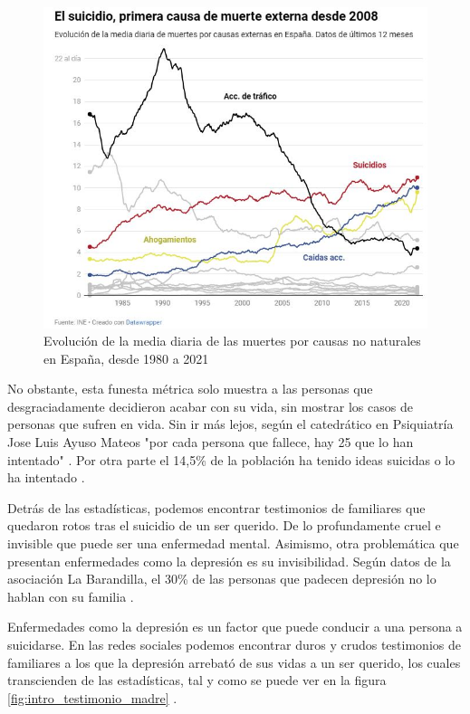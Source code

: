 \begin{figure}[h]
    \centering
    \includegraphics[width=0.85\linewidth]{figures/causas no naturales.jpg}
    \caption{Evolución de la media diaria de las muertes por causas no naturales en España, desde 1980 a 2021 \cite{sanchez_once_2023}}
    \label{fig:intro:causas_no_naturales}
\end{figure}

No obstante, esta funesta métrica solo muestra a las personas que desgraciadamente decidieron acabar con su vida, sin mostrar los casos de personas que sufren en vida. Sin ir más lejos, según el catedrático en Psiquiatría Jose Luis Ayuso Mateos "por cada persona que fallece, hay 25 que lo han intentado"  \cite{sanchez_once_2023}.  Por otra parte el 14,5\% de la población ha tenido ideas suicidas o lo ha intentado \cite{comunicacion_cuatro_2023}.

Detrás de las estadísticas, podemos encontrar testimonios de familiares que quedaron rotos tras el suicidio de un ser querido. De lo profundamente cruel e invisible que puede ser una enfermedad mental. Asimismo, otra problemática que presentan enfermedades como la depresión es su invisibilidad. Según datos de la asociación La Barandilla, el 30\% de las personas que padecen depresión no lo hablan con su familia \cite{abc_familia_30_2021}.

Enfermedades como la depresión es un factor que puede conducir a una persona a suicidarse. En las redes sociales podemos encontrar duros y crudos testimonios de familiares a los que la depresión arrebató de sus vidas a un ser querido, los cuales transcienden de las estadísticas, tal y como se puede ver en la figura \ref{fig:intro_testimonio_madre} .

